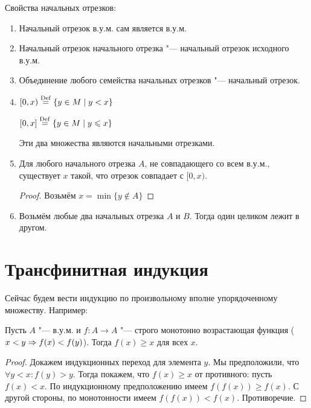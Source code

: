 Свойства начальных отрезков:
\begin{enumerate}
	\item
		Начальный отрезок в.у.м. сам является в.у.м.
	\item
		Начальный отрезок начального отрезка "--- начальный отрезок исходного в.у.м.
	\item
		Объединение любого семейства начальных отрезков "--- начальный отрезок.
	\item
		\begin{Def}
			$[0, x) \stackrel{\mathrm{Def}}{=} \{ y \in M \mid y < x\}$
		
			$[0, x] \stackrel{\mathrm{Def}}{=} \{ y \in M \mid y \leqslant x \}$
		\end{Def}
		Эти два множества являются начальными отрезками.
	\item
		Для любого начального отрезка $A$, не совпадающего со всем в.у.м., существует $x$ такой,
		что отрезок совпадает с $[0, x)$.
		\begin{proof}
			Возьмём $x = \min \{ y \notin A \}$
		\end{proof}
	\item
		Возьмём любые два начальных отрезка $A$ и $B$.
		Тогда один целиком лежит в другом.
\end{enumerate}

\section{Трансфинитная индукция}
Сейчас будем вести индукцию по произвольному вполне упорядоченному множеству.
Например:

\begin{theorem}
	Пусть $A$ "--- в.у.м. и $f \colon A \to A$ "--- строго монотонно возрастающая функция ($x < y \Rightarrow f(x) < f(y)$).
	Тогда $f(x) \ge x$ для всех $x$.
\end{theorem}
\begin{proof}
	Докажем индукционных переход для элемента $y$.
	Мы предположили, что $\forall y < x \colon f(y) > y$.
	Тогда покажем, что $f(x) \ge x$ от противного: пусть $f(x) < x$.
	По индукционному предположению имеем $f(f(x)) \ge f(x)$.
	С другой стороны, по монотонности имеем $f(f(x)) < f(x)$.
	Противоречие.
\end{proof}


